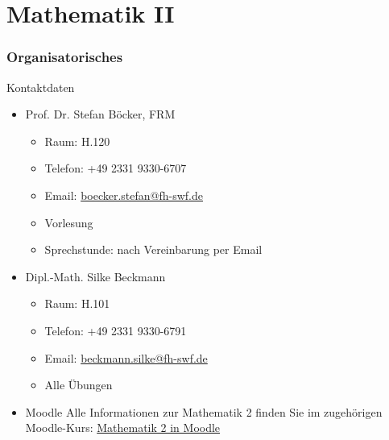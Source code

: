 \part{Mathematik II}


\section*{Organisatorisches}
\begin{frame}{Kontaktdaten}
	\begin{itemize}
		\item Prof. Dr. Stefan Böcker, FRM
		\begin{itemize}
			\item Raum: H.120
			\item Telefon: +49 2331 9330-6707
			\item Email: \href{mailto:boecker.stefan@fh-swf.de}{boecker.stefan@fh-swf.de}
			\item Vorlesung%
			\item Sprechstunde: nach Vereinbarung per Email
		\end{itemize}
		\item Dipl.-Math. Silke Beckmann
		\begin{itemize}
			\item Raum: H.101
			\item Telefon: +49 2331 9330-6791
			\item Email: \href{mailto:beckmann.silke@fh-swf.de}{beckmann.silke@fh-swf.de}
			\item Alle Übungen
		\end{itemize}
		\item Moodle
			Alle Informationen zur Mathematik 2 finden Sie im zugehörigen Moodle-Kurs:
			\href{https://elearning.fh-swf.de/course/view.php?id=7719}{Mathematik 2 in Moodle}
	\end{itemize}
\end{frame}

